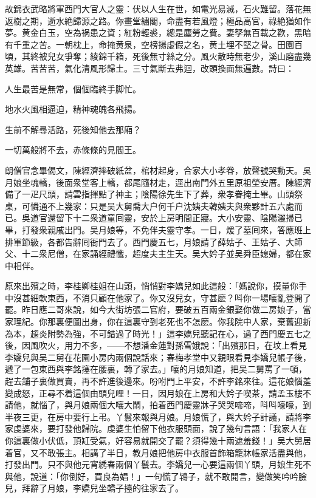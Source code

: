 故錦衣武略將軍西門大官人之靈：伏以人生在世，如電光易滅，石火難留。落花無返樹之期，逝水絶歸源之路。你畫堂繡閣，命盡有若風燈；極品高官，祿絶猶如作夢。黄金白玉，空為祸患之資；紅粉輕裘，總是塵勞之費。妻孥無百載之歡，黑暗有千重之苦。一朝枕上，命掩黄泉，空榜揚虚假之名，黄土埋不堅之骨。田園百頃，其終被兒女爭奪；綾錦千箱，死後無寸絲之分。風火散時無老少，溪山磨盡幾英雄。苦苦苦，氣化清風形歸土。三寸氣斷去弗迴，改頭換面無遍數。詩曰：

人生最苦是無常，個個臨終手脚忙。

地水火風相逼迫，精神魂魄各飛揚。

生前不解尋活路，死後知他去那廂？

一切萬般將不去，赤條條的見閻王。

朗僧官念畢偈文，陳經濟摔破紙盆，棺材起身，合家大小孝眷，放聲號哭動天。吳月娘坐魂轎，後面衆堂客上轎，都尾隨材走，逕出南門外五里原祖塋安厝。陳經濟備了一疋尺頭，請雲指揮點了神主；陰陽徐先生下了葬，衆孝眷掩土畢。山頭祭桌，可憐通不上幾家：只是吴大舅喬大户何千户沈姨夫韓姨夫與衆夥計五六處而已。吳道官還留下十二衆道童囘靈，安於上房明間正寢。大小安靈、陰陽灑掃已畢，打發衆親戚出門。吴月娘等，不免伴夫靈守孝。一日，煖了墓囘來，答應班上排軍節級，各都告辭囘衙門去了。西門慶五七，月娘請了薛姑子、王姑子、大師父、十二衆尼僧，在家誦經禮懺，超度夫主生天。吴大妗子並吴舜臣媳婦，都在家中相伴。

原來出殯之時，李桂卿桂姐在山頭，悄悄對李嬌兒如此這般：「媽說你，摸量你手中沒甚細軟東西，不消只顧在他家了。你又沒兒女，守甚麽？呌你一場嚷亂登開了罷。昨日應二哥來說，如今大街坊張二官府，要破五百兩金銀娶你做二房娘子，當家理紀。你那裏便圖出身，你在這裏守到老死也不怎麽。你我院中人家，棄舊迎新為本，趨炎附勢為強，不可錯過了時光！」這李嬌兒聽記在心，過了西門慶五七之後，因風吹火，用力不多，——不想潘金蓮對孫雪娥說：「出殯那日，在坟上看見李嬌兒與吴二舅在花園小房内兩個說話來；春梅孝堂中又親眼看見李嬌兒帳子後，遞了一包東西與李銘㩙在腰裏，轉了家去。」嚷的月娘知道，把吴二舅罵了一頓，趕去舖子裏做買賣，再不許進後邊來。吩咐門上平安，不許李銘來往。這花娘惱羞變成怒，正尋不着這個由頭兒哩！一日，因月娘在上房和大妗子喫茶，請孟玉樓不請他，就惱了，與月娘兩個大嚷大鬧，拍着西門慶靈牀子哭哭啼啼，呌呌嚎嚎，到半夜三更，在房中要行上弔。丫鬟來報與月娘。月娘慌了，與大妗子計議，請將李家虔婆來，要打發他歸院。虔婆生怕留下他衣服頭面，說了幾句言語：「我家人在你這裏做小伏低，頂缸受氣，好容易就開交了罷？須得幾十兩遮羞錢！」吴大舅居着官，又不敢張主。相講了半日，教月娘把他房中衣服首飾箱籠牀帳家活盡與他，打發出門。只不與他元宵綉春兩個丫鬟去。李嬌兒一心要這兩個丫頭，月娘生死不與他，說道：「你倒好，買良為娼！」一句慌了鴇子，就不敢開言，變做笑吟吟臉兒，拜辭了月娘，李嬌兒坐轎子擡的往家去了。

